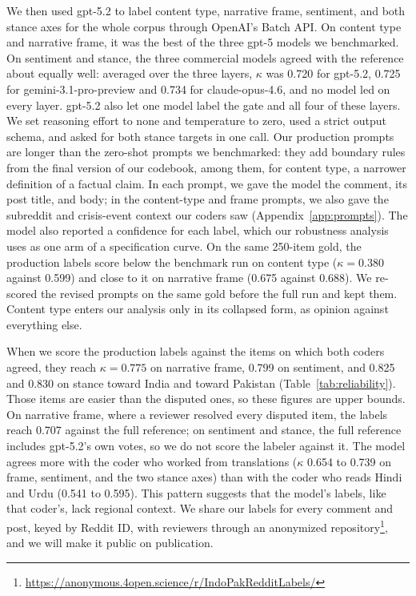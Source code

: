 We then used gpt-5.2 to label content type, narrative frame, sentiment, and both stance axes for the whole corpus through OpenAI's Batch API. On content type and narrative frame, it was the best of the three gpt-5 models we benchmarked. On sentiment and stance, the three commercial models agreed with the reference about equally well: averaged over the three layers, $\kappa$ was 0.720 for gpt-5.2, 0.725 for gemini-3.1-pro-preview and 0.734 for claude-opus-4.6, and no model led on every layer. gpt-5.2 also let one model label the gate and all four of these layers. We set reasoning effort to none and temperature to zero, used a strict output schema, and asked for both stance targets in one call. Our production prompts are longer than the zero-shot prompts we benchmarked: they add boundary rules from the final version of our codebook, among them, for content type, a narrower definition of a factual claim. In each prompt, we gave the model the comment, its post title, and body; in the content-type and frame prompts, we also gave the subreddit and crisis-event context our coders saw (Appendix~\ref{app:prompts}). The model also reported a confidence for each label, which our robustness analysis uses as one arm of a specification curve. On the same 250-item gold, the production labels score below the benchmark run on content type ($\kappa = 0.380$ against 0.599) and close to it on narrative frame (0.675 against 0.688). We re-scored the revised prompts on the same gold before the full run and kept them. Content type enters our analysis only in its collapsed form, as opinion against everything else.

When we score the production labels against the items on which both coders agreed, they reach $\kappa = 0.775$ on narrative frame, 0.799 on sentiment, and 0.825 and 0.830 on stance toward India and toward Pakistan (Table~\ref{tab:reliability}). Those items are easier than the disputed ones, so these figures are upper bounds. On narrative frame, where a reviewer resolved every disputed item, the labels reach 0.707 against the full reference; on sentiment and stance, the full reference includes gpt-5.2's own votes, so we do not score the labeler against it. The model agrees more with the coder who worked from translations ($\kappa$ 0.654 to 0.739 on frame, sentiment, and the two stance axes) than with the coder who reads Hindi and Urdu (0.541 to 0.595). This pattern suggests that the model's labels, like that coder's, lack regional context. We share our labels for every comment and post, keyed by Reddit ID, with reviewers through an anonymized repository\footnote{\url{https://anonymous.4open.science/r/IndoPakRedditLabels/}}, and we will make it public on publication.

